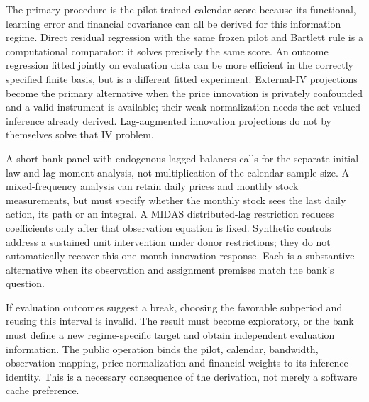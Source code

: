 The primary procedure is the pilot-trained calendar score because its
functional, learning error and financial covariance can all be derived for
this information regime. Direct residual regression with the same frozen
pilot and Bartlett rule is a computational comparator: it solves precisely
the same score. An outcome regression fitted jointly on evaluation data can
be more efficient in the correctly specified finite basis, but is a
different fitted experiment. External-IV projections become the primary
alternative when the price innovation is privately confounded and a valid
instrument is available; their weak normalization needs the set-valued
inference already derived. Lag-augmented innovation projections do not by
themselves solve that IV problem.

A short bank panel with endogenous lagged balances calls for the separate
initial-law and lag-moment analysis, not multiplication of the calendar
sample size. A mixed-frequency analysis can retain daily prices and monthly
stock measurements, but must specify whether the monthly stock sees the
last daily action, its path or an integral. A MIDAS distributed-lag
restriction reduces coefficients only after that observation equation is
fixed. Synthetic controls address a sustained unit intervention under donor
restrictions; they do not automatically recover this one-month innovation
response. Each is a substantive alternative when its observation and
assignment premises match the bank's question.

If evaluation outcomes suggest a break, choosing the favorable subperiod and
reusing this interval is invalid. The result must become exploratory, or
the bank must define a new regime-specific target and obtain independent
evaluation information. The public operation binds the pilot, calendar,
bandwidth, observation mapping, price normalization and financial weights
to its inference identity. This is a necessary consequence of the derivation,
not merely a software cache preference.

